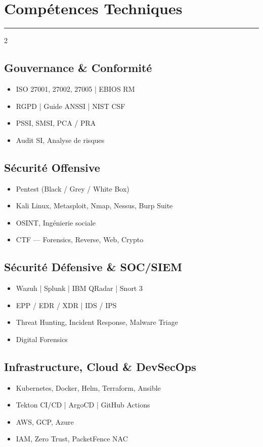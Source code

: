 \section{Compétences Techniques}
{\color{blue} \rule{\linewidth}{1mm}}
\vspace{-3mm}
\begin{multicols}{2}

\subsection*{Gouvernance \& Conformité}
\begin{itemize}
  \item ISO 27001, 27002, 27005 | EBIOS RM
  \item RGPD | Guide ANSSI | NIST CSF
  \item PSSI, SMSI, PCA / PRA
  \item Audit SI, Analyse de risques
\end{itemize}

\subsection*{Sécurité Offensive}
\begin{itemize}
  \item Pentest (Black / Grey / White Box)
  \item Kali Linux, Metasploit, Nmap, Nessus, Burp Suite
  \item OSINT, Ingénierie sociale
  \item CTF — Forensics, Reverse, Web, Crypto
\end{itemize}

\columnbreak

\subsection*{Sécurité Défensive \& SOC/SIEM}
\begin{itemize}
  \item Wazuh | Splunk | IBM QRadar | Snort 3
  \item EPP / EDR / XDR | IDS / IPS
  \item Threat Hunting, Incident Response, Malware Triage
  \item Digital Forensics 
\end{itemize}

\subsection*{Infrastructure, Cloud \& DevSecOps}
\begin{itemize}
  \item Kubernetes, Docker, Helm, Terraform, Ansible
  \item Tekton CI/CD | ArgoCD | GitHub Actions
  \item AWS, GCP, Azure
  \item IAM, Zero Trust, PacketFence NAC
\end{itemize}


\end{multicols}

